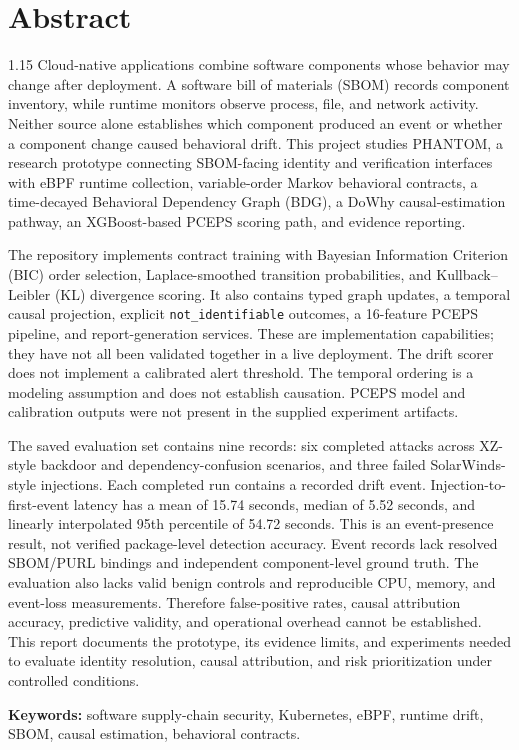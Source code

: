 \documentclass[12pt,a4paper,oneside]{report}
\begin{document}
\chapter*{Abstract}
\begin{spacing}{1.15}
Cloud-native applications combine software components whose behavior may change after deployment. A software bill of materials (SBOM) records component inventory, while runtime monitors observe process, file, and network activity. Neither source alone establishes which component produced an event or whether a component change caused behavioral drift. This project studies PHANTOM, a research prototype connecting SBOM-facing identity and verification interfaces with eBPF runtime collection, variable-order Markov behavioral contracts, a time-decayed Behavioral Dependency Graph (BDG), a DoWhy causal-estimation pathway, an XGBoost-based PCEPS scoring path, and evidence reporting.

The repository implements contract training with Bayesian Information Criterion (BIC) order selection, Laplace-smoothed transition probabilities, and Kullback--Leibler (KL) divergence scoring. It also contains typed graph updates, a temporal causal projection, explicit \texttt{not\_identifiable} outcomes, a 16-feature PCEPS pipeline, and report-generation services. These are implementation capabilities; they have not all been validated together in a live deployment. The drift scorer does not implement a calibrated alert threshold. The temporal ordering is a modeling assumption and does not establish causation. PCEPS model and calibration outputs were not present in the supplied experiment artifacts.

The saved evaluation set contains nine records: six completed attacks across XZ-style backdoor and dependency-confusion scenarios, and three failed SolarWinds-style injections. Each completed run contains a recorded drift event. Injection-to-first-event latency has a mean of 15.74 seconds, median of 5.52 seconds, and linearly interpolated 95th percentile of 54.72 seconds. This is an event-presence result, not verified package-level detection accuracy. Event records lack resolved SBOM/PURL bindings and independent component-level ground truth. The evaluation also lacks valid benign controls and reproducible CPU, memory, and event-loss measurements. Therefore false-positive rates, causal attribution accuracy, predictive validity, and operational overhead cannot be established. This report documents the prototype, its evidence limits, and experiments needed to evaluate identity resolution, causal attribution, and risk prioritization under controlled conditions.
\end{spacing}
\noindent\textbf{Keywords:} software supply-chain security, Kubernetes, eBPF, runtime drift, SBOM, causal estimation, behavioral contracts.
\clearpage{}
\end{document}
